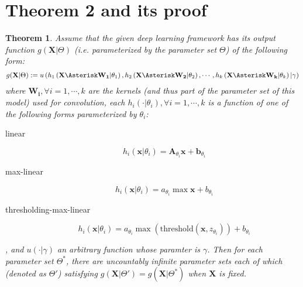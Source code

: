 \documentclass[12pt]{article}
\newcommand{\vect}[1]{\mathbf{#1}}
\newcommand{\matrixSymbol}[1]{\mathbf{#1}}
\newtheorem{theorem}{Theorem}
\begin{document}
\section{Theorem 2 and its proof}

\begin{theorem}
Assume that the given deep learning framework has its output function $g(\matrixSymbol{X}|\Theta)$ (i.e. parameterized by the parameter set $\Theta$) of the following form: 
\begin{align}
g(\matrixSymbol{X}|\Theta) := u \left( h_1 \left( \matrixSymbol{X} \Asterisk \matrixSymbol{W_{1}}  | \theta_1 \right), h_2 \left( \matrixSymbol{X} \Asterisk \matrixSymbol{W_{2}}  | \theta_2 \right), \cdots, h_k \left( \matrixSymbol{X} \Asterisk \matrixSymbol{W_{k}}  | \theta_k \right) | \gamma \right)
\end{align}
where $\matrixSymbol{W_i},  \forall i=1, \cdots, k $ are the kernels (and thus part of the parameter set of this model) used for convolution, each $h_i(\cdot|\theta_i ), \forall i=1, \cdots, k $ is a function of one of the following forms parameterized by $\theta_i$:
\begin{description}
\item[linear] \begin{equation}h_i(\vect{x}|\theta_i ) = \matrixSymbol{A}_{\theta_i}\vect{x} + \vect{b}_{\theta_i}\end{equation}
\item[max-linear] \begin{equation}h_i(\vect{x}|\theta_i ) = a_{\theta_i}\max{\vect{x}} + b_{\theta_i} \end{equation}
\item[thresholding-max-linear]  \begin{equation}h_i(\vect{x}|\theta_i ) = a_{\theta_i}\max{(\mathrm{threshold}(\vect{x}, z_{\theta_i}))} + b_{\theta_i} \end{equation}
\end{description}
, and $u(\cdot | \gamma)$ an arbitrary function whose paramter is $\gamma$. Then for each parameter set $\Theta^{*}$, there are uncountably infinite parameter sets each of which (denoted as $\Theta'$) satisfying $g(\matrixSymbol{X}|\Theta') = g(\matrixSymbol{X}|\Theta^{*})$ when $\matrixSymbol{X}$ is fixed.
\end{theorem}
\end{document}
